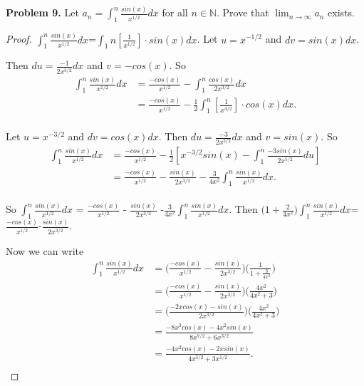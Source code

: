 \documentclass[12pt]{article}
\begin{document}
\begin{flushleft}

\textbf{Problem 9.} Let $a_{n}= \int_{1}^{n} \frac{sin(x)}{x^{1/2}} dx$ for all $n \in \mathbb{N}$. Prove that $\lim_{n \to \infty} a_{n}$ exists. 

\vspace{.2cm}

\begin{proof}

$\int_{1}^{n} \frac{sin(x)}{x^{1/2}} dx$=$\int_{1}{n} [\frac{1}{x^{1/2}}] \cdot sin(x) dx$. Let $u=x^{-1/2}$ and $dv=sin(x)dx$. 

\vspace{.1cm}

Then $du=\frac{-1}{2x^{3/2}}dx$ and $v=-cos(x)$. So 
\begin{align*}
\int_{1}^{n} \frac{sin(x)}{x^{1/2}} dx &= \frac{-cos(x)}{x^{1/2}} - \int_{1}^{n} \frac{cos(x)}{2x^{3/2}} dx \\
							  &= \frac{-cos(x)}{x^{1/2}} - \frac{1}{2} \int_{1}^{n} [\frac{1}{x^{3/2}}] \cdot cos(x) dx. \\
\end{align*}

Let $u=x^{-3/2}$ and $dv=cos(x)dx$. Then $du=\frac{-3}{2x^{5/2}}dx$ and $v=sin(x)$. So
\begin{align*}
\int_{1}^{n} \frac{sin(x)}{x^{1/2}} dx &= \frac{-cos(x)}{x^{1/2}} - \frac{1}{2}[x^{-3/2}sin(x)-\int_{1}^{n} \frac{-3sin(x)}{2x^{5/2}} du] \\
						      &= \frac{-cos(x)}{x^{1/2}} - \frac{sin(x)}{2x^{3/2}} -\frac{3}{4x^{2}} \int_{1}^{n} \frac{sin(x)}{x^{1/2}} dx.\\
\end{align*}

So $\int_{1}^{n} \frac{sin(x)}{x^{1/2}} dx$ = $\frac{-cos(x)}{x^{1/2}}$ - $\frac{sin(x)}{2x^{3/2}}$ -$\frac{3}{4x^{2}} \int_{1}^{n} \frac{sin(x)}{x^{1/2}} dx$. Then 
$\big(1+\frac{2}{4x^{2}}\big) \int_{1}^{n} \frac{sin(x)}{x^{1/2}} dx$=$\frac{-cos(x)}{x^{1/2}}$-$\frac{sin(x)}{2x^{3/2}}$.

\vspace{.1cm}

Now we can write
\begin{align*}
\int_{1}^{n} \frac{sin(x)}{x^{1/2}}dx 
	&=\big( \frac{-cos(x)}{x^{1/2}} - \frac{sin(x)}{2x^{3/2}}\big) \big( \frac{1}{1+\frac{3}{4x^{2}}} \big) \\
	&= \big( \frac{-cos(x)}{x^{1/2}} - \frac{sin(x)}{2x^{3/2}} \big) \big( \frac{4x^{2}}{4x^{2}+3} \big) \\
	&= \big( \frac{-2xcos(x)-sin(x)}{2x^{3/2}} \big) \big( \frac{4x^{2}}{4x^{2}+3} \big) \\
	&= \frac{-8x^{3}cos(x)-4x^{2}sin(x)}{8x^{7/2}+6x^{3/2}} \\
	&= \frac{-4x^{2}cos(x) - 2xsin(x)}{4x^{5/2}+3x^{1/2}}.\\
\end{align*}


\end{proof}
\end{flushleft}
\end{document}
